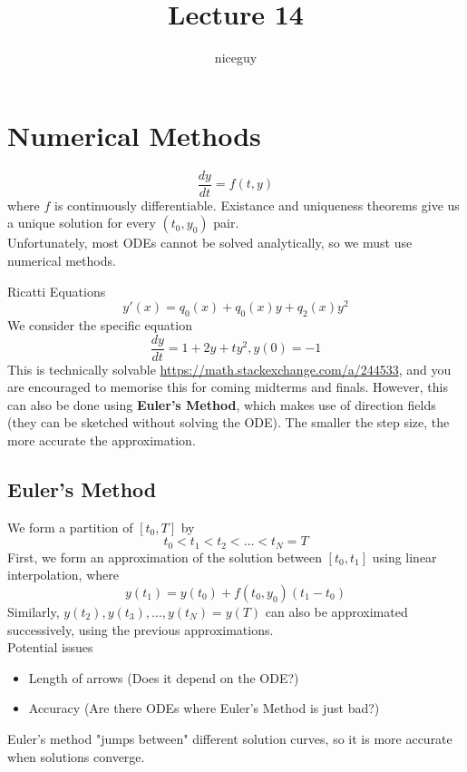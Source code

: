 \documentclass[12pt]{article}
\author{niceguy}
\title{Lecture 14}
\begin{document}
\maketitle

\section{Numerical Methods}

$$\frac{dy}{dt} = f(t,y)$$
where $f$ is continuously differentiable. Existance and uniqueness theorems give us a unique solution for every $(t_0, y_0)$ pair. \\
Unfortunately, most ODEs cannot be solved analytically, so we must use numerical methods.

\begin{ex}
	Ricatti Equations
	$$y'(x) = q_0(x) + q_0(x)y + q_2(x)y^2$$
	We consider the specific equation
	$$\frac{dy}{dt} = 1 + 2y + ty^2, y(0) = -1$$
	This is technically solvable \url{https://math.stackexchange.com/a/244533}, and you are encouraged to memorise this for coming midterms and finals. However, this can also be done using \textbf{Euler's Method}, which makes use of direction fields (they can be sketched without solving the ODE). The smaller the step size, the more accurate the approximation.
\end{ex}

\subsection{Euler's Method}

We form a partition of $[t_0, T]$ by
$$t_0 < t_1 < t_2 < \dots < t_N = T$$
First, we form an approximation of the solution between $[t_0, t_1]$ using linear interpolation, where
$$y(t_1) = y(t_0) + f(t_0, y_0)(t_1-t_0)$$
Similarly, $y(t_2), y(t_3), \dots, y(t_N) = y(T)$ can also be approximated successively, using the previous approximations. \\
Potential issues
\begin{itemize}
	\item Length of arrows (Does it depend on the ODE?)
	\item Accuracy (Are there ODEs where Euler's Method is just bad?)
\end{itemize}

Euler's method "jumps between" different solution curves, so it is more accurate when solutions converge.
\end{document}

